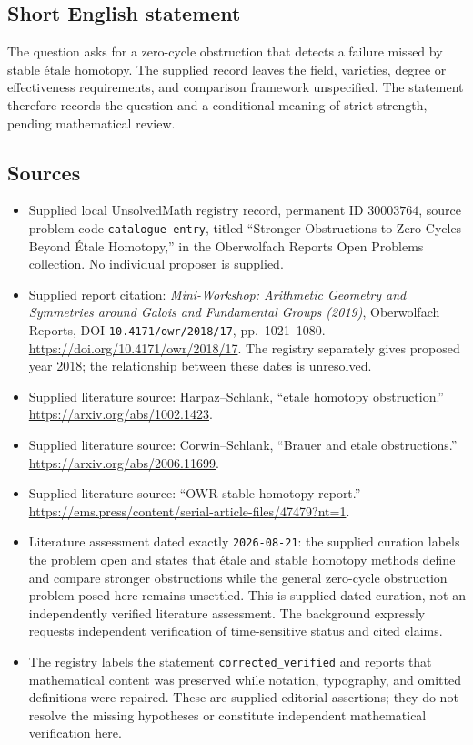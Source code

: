 \documentclass[11pt]{article}
\begin{document}
\subsection{Short English statement}
The question asks for a zero-cycle obstruction that detects a failure missed by stable \(\text{\'etale}\) homotopy. The supplied record leaves the field, varieties, degree or effectiveness requirements, and comparison framework unspecified. The statement therefore records the question and a conditional meaning of strict strength, pending mathematical review.
\subsection{Sources}
\begin{itemize}
\item Supplied local UnsolvedMath registry record, permanent ID \(30003764\), source problem code \texttt{catalogue entry}, titled ``Stronger Obstructions to Zero-Cycles Beyond Étale Homotopy,'' in the Oberwolfach Reports Open Problems collection. No individual proposer is supplied.
\item Supplied report citation: \emph{Mini-Workshop: Arithmetic Geometry and Symmetries around Galois and Fundamental Groups (2019)}, Oberwolfach Reports, DOI \texttt{10.4171/owr/2018/17}, pp.\ 1021--1080. \url{https://doi.org/10.4171/owr/2018/17}. The registry separately gives proposed year 2018; the relationship between these dates is unresolved.
\item Supplied literature source: Harpaz--Schlank, ``etale homotopy obstruction.'' \url{https://arxiv.org/abs/1002.1423}.
\item Supplied literature source: Corwin--Schlank, ``Brauer and etale obstructions.'' \url{https://arxiv.org/abs/2006.11699}.
\item Supplied literature source: ``OWR stable-homotopy report.'' \url{https://ems.press/content/serial-article-files/47479?nt=1}.
\item Literature assessment dated exactly \texttt{2026-08-21}: the supplied curation labels the problem open and states that étale and stable homotopy methods define and compare stronger obstructions while the general zero-cycle obstruction problem posed here remains unsettled. This is supplied dated curation, not an independently verified literature assessment. The background expressly requests independent verification of time-sensitive status and cited claims.
\item The registry labels the statement \texttt{corrected\_verified} and reports that mathematical content was preserved while notation, typography, and omitted definitions were repaired. These are supplied editorial assertions; they do not resolve the missing hypotheses or constitute independent mathematical verification here.
\end{itemize}
\end{document}
